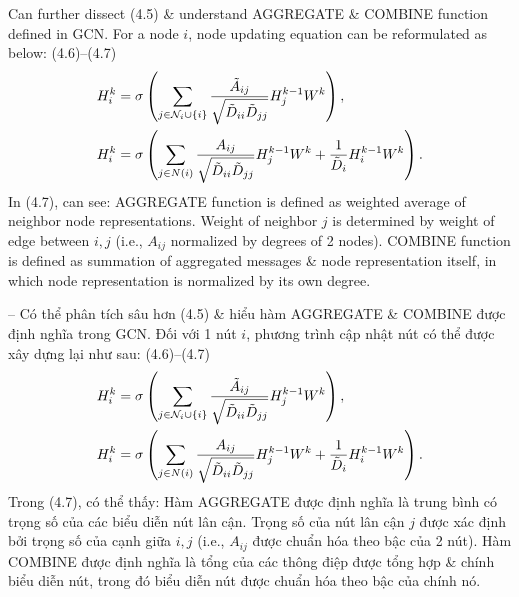 \documentclass{article}
\begin{document}
\begin{itemize}
\begin{itemize}
\begin{itemize}
            Can further dissect (4.5) \& understand AGGREGATE \& COMBINE function defined in GCN. For a node $i$, node updating equation can be reformulated as below: (4.6)--(4.7)
            \begin{align*}
                H_i^k &= \sigma\left(\sum_{j\in{\cal N}_i\cup\{i\}} \frac{\tilde{A}_{ij}}{\sqrt{\tilde{D}_{ii}\tilde{D}_{jj}}}H_j^{k-1}W^k\right),\\
                H_i^k &= \sigma\left(\sum_{j\in N(i)} \frac{A_{ij}}{\sqrt{\tilde{D}_{ii}\tilde{D}_{jj}}}H_j^{k-1}W^k + \frac{1}{\tilde{D}_i}H_i^{k-1}W^k\right).
            \end{align*}
            In (4.7), can see: AGGREGATE function is defined as weighted average of neighbor node representations. Weight of neighbor $j$ is determined by weight of edge between $i,j$ (i.e., $A_{ij}$ normalized by degrees of 2 nodes). COMBINE function is defined as summation of aggregated messages \& node representation itself, in which node representation is normalized by its own degree.

            -- Có thể phân tích sâu hơn (4.5) \& hiểu hàm AGGREGATE \& COMBINE được định nghĩa trong GCN. Đối với 1 nút $i$, phương trình cập nhật nút có thể được xây dựng lại như sau: (4.6)--(4.7)
            \begin{align*}
                H_i^k &= \sigma\left(\sum_{j\in{\cal N}_i\cup\{i\}} \frac{\tilde{A}_{ij}}{\sqrt{\tilde{D}_{ii}\tilde{D}_{jj}}}H_j^{k-1}W^k\right),\\
                H_i^k &= \sigma\left(\sum_{j\in N(i)} \frac{A_{ij}}{\sqrt{\tilde{D}_{ii}\tilde{D}_{jj}}}H_j^{k-1}W^k + \frac{1}{\tilde{D}_i}H_i^{k-1}W^k\right).
            \end{align*}
            Trong (4.7), có thể thấy: Hàm AGGREGATE được định nghĩa là trung bình có trọng số của các biểu diễn nút lân cận. Trọng số của nút lân cận $j$ được xác định bởi trọng số của cạnh giữa $i,j$ (i.e., $A_{ij}$ được chuẩn hóa theo bậc của 2 nút). Hàm COMBINE được định nghĩa là tổng của các thông điệp được tổng hợp \& chính biểu diễn nút, trong đó biểu diễn nút được chuẩn hóa theo bậc của chính nó.


\end{itemize}
\end{itemize}
\end{itemize}
\end{document}
